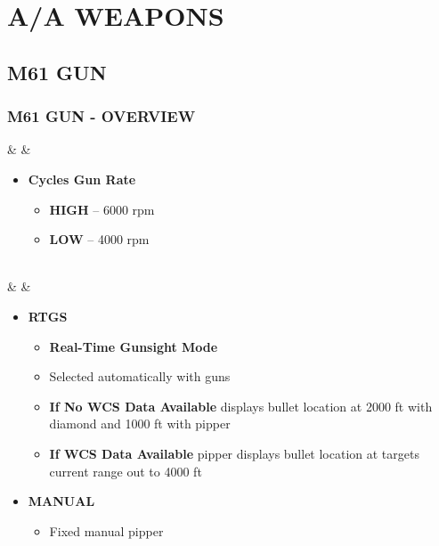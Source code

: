 \documentclass[fontInter]{TechCheck}
\begin{document}
	\cleardoublepage

	\chapter{A/A WEAPONS}
	\minitoc
	\cleardoublepage

	\section{M61 GUN}
	\subsection{M61 GUN - OVERVIEW}
	\begin{listlongtable}
		\textbf{\textbullet} &  \hfill\null {} &
		\begin{minipage}[t]{\linewidth}
			\vspace{-7pt}
			\begin{itemize}
				\item \textbf{Cycles Gun Rate}
				\begin{itemize}
					\item \textbf{HIGH} -- 6000 rpm
					\item \textbf{LOW} -- 4000 rpm
				\end{itemize}
			\end{itemize}
		\end{minipage} \\
		\midrule
		\textbf{\textbullet} &  &
		\begin{minipage}[t]{\linewidth}
			\vspace{-7pt}
			\begin{itemize}
				\item \textbf{RTGS}
				\begin{itemize}
					\item \textbf{Real-Time Gunsight Mode}
					\item Selected automatically with guns
					\item \textbf{If No WCS Data Available} displays bullet location at 2000 ft with diamond and 1000 ft with pipper
					\item \textbf{If WCS Data Available} pipper displays bullet location at targets current range out to 4000 ft
				\end{itemize}
				\item \textbf{MANUAL}
				\begin{itemize}
					\item Fixed manual pipper

\end{itemize}
\end{itemize}
\end{minipage}
\end{listlongtable}
\end{document}
